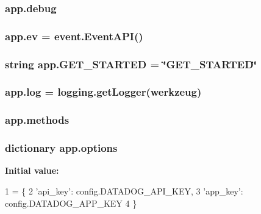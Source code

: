 \subsubsection[{debug}]{\setlength{\rightskip}{0pt plus 5cm}app.\+debug}\label{namespaceapp_ab4a362027d4aa3246e0e0f57ebf177b0}
\subsubsection[{ev}]{\setlength{\rightskip}{0pt plus 5cm}app.\+ev = {\bf event.\+Event\+A\+PI}()}\label{namespaceapp_ac021cf6189eb71469fc58f7feca37c13}
\subsubsection[{G\+E\+T\+\_\+\+S\+T\+A\+R\+T\+ED}]{\setlength{\rightskip}{0pt plus 5cm}string app.\+G\+E\+T\+\_\+\+S\+T\+A\+R\+T\+ED = \char`\"{}G\+E\+T\+\_\+\+S\+T\+A\+R\+T\+ED\char`\"{}}\label{namespaceapp_ae5d5458ea38d2c04b533b1715cb28586}
\subsubsection[{log}]{\setlength{\rightskip}{0pt plus 5cm}app.\+log = logging.\+get\+Logger(\textquotesingle{}werkzeug\textquotesingle{})}\label{namespaceapp_a884fd4d09ca9554dcf7342873cfe19ee}
\subsubsection[{methods}]{\setlength{\rightskip}{0pt plus 5cm}app.\+methods}\label{namespaceapp_acc2d9f753751d59302fae3b2bfe99571}
\subsubsection[{options}]{\setlength{\rightskip}{0pt plus 5cm}dictionary app.\+options}\label{namespaceapp_a50acd9da3cf030251c9fb7e2f2977084}
{\bfseries Initial value\+:}
\begin{DoxyCode}
1 = \{
2     \textcolor{stringliteral}{'api\_key'}: config.DATADOG\_API\_KEY,
3     \textcolor{stringliteral}{'app\_key'}: config.DATADOG\_APP\_KEY
4 \}
\end{DoxyCode}
